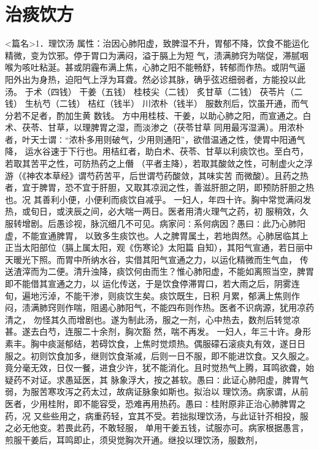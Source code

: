 \documentclass[a4paper,12pt,UTF8,twoside]{ctexbook}
\begin{document}
\chapter{治痰饮方}
<篇名>1．理饮汤
属性：治因心肺阳虚，致脾湿不升，胃郁不降，饮食不能运化精微，变为饮邪。停于胃口为满闷，溢于膈上为短 
气，渍满肺窍为喘促，滞腻咽喉为咳吐粘涎。甚或阴霾布满上焦，心肺之阳不能畅舒，转郁而作热。或阴气逼 
阳外出为身热，迫阳气上浮为耳聋。然必诊其脉，确乎弦迟细弱者，方能投以此汤。 
于术（四钱） 干姜（五钱） 桂枝尖（二钱） 炙甘草（二钱） 茯苓片（二钱） 生杭芍（二钱） 
桔红（钱半） 川浓朴（钱半） 
服数剂后，饮虽开通，而气分若不足者，酌加生黄 数钱。 
方中用桂枝、干姜，以助心肺之阳，而宣通之。白术、茯苓、甘草，以理脾胃之湿，而淡渗之（茯苓甘草 
同用最泻湿满）。用浓朴者，叶天士谓∶“浓朴多用则破气，少用则通阳”，欲借温通之性，使胃中阳通气降， 
运水谷速于下行也。用桔红者，助白术、茯苓、甘草以利痰饮也。至白芍，若取其苦平之性，可防热药之上僭 
（平者主降），若取其酸敛之性，可制虚火之浮游（《神农本草经》谓芍药苦平，后世谓芍药酸敛，其味实苦 
而微酸）。且药之热者，宜于脾胃，恐不宜于肝胆，又取其凉润之性，善滋肝胆之阴，即预防肝胆之热也。况 
其善利小便，小便利而痰饮自减乎。 
一妇人，年四十许。胸中常觉满闷发热，或旬日，或浃辰之间，必大喘一两日。医者用清火理气之药，初 
服稍效，久服转增剧。后愚诊视，脉沉细几不可见。病家问∶系何病因？愚曰∶此乃心肺阳虚，不能宣通脾胃， 
以致多生痰饮也。人之脾胃属土，若地舆然。心肺居临其上正当太阳部位（膈上属太阳，观《伤寒论》太阳篇 
自知），其阳气宣通，若日丽中天暖光下照。而胃中所纳水谷，实借其阳气宣通之力，以运化精微而生气血， 
传送渣滓而为二便。清升浊降，痰饮何由而生？惟心肺阳虚，不能如离照当空，脾胃即不能借其宣通之力，以 
运化传送，于是饮食停滞胃口，若大雨之后，阴雾连旬，遍地污淖，不能干渗，则痰饮生矣。痰饮既生，日积 
月累，郁满上焦则作闷，渍满肺窍则作喘，阻遏心肺阳气，不能四布则作热。医者不识病源，犹用凉药清之， 
勿怪其久而增剧也。遂为制此汤，服之一剂，心中热去，数剂后转觉凉甚。遂去白芍，连服二十余剂，胸次豁 
然，喘不再发。 
一妇人，年三十许。身形素丰。胸中痰涎郁结，若碍饮食，上焦时觉烦热。偶服礞石滚痰丸有效，遂日日 
服之。初则饮食加多，继则饮食渐减，后则一日不服，即不能进饮食。又久服之。 
竟分毫无效，日仅一餐，进食少许，犹不能消化。且时觉热气上腾，耳鸣欲聋，始疑药不对证。求愚延医，其 
脉象浮大，按之甚软。愚曰∶此证心肺阳虚，脾胃气弱，为服苦寒攻泻之药太过，故病证脉象如斯也。拟治以 
理饮汤。病家谓，从前医者，少用桂附，即不能容受，恐难再用热药。愚曰∶桂附原非正治心肺脾胃之药，况 
又些些用之，病重药轻，宜其不受。若拙拟理饮汤，与此证针芥相投，服之必无他变。若畏此药，不敢轻服， 
单用干姜五钱，试服亦可。病家根据愚言，煎服干姜后，耳鸣即止，须臾觉胸次开通。继投以理饮汤，服数剂， 
\end{document}
